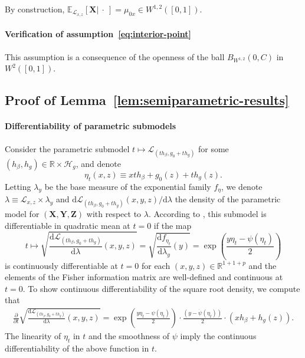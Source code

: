 \documentclass[aos]{imsart}
\theoremstyle{plain}
\theoremstyle{remark}
\newcommand{\E}{\mathbb E}								%
\newcommand{\R}{\mathbb{R}}								%
\newcommand{\prx}{\bm X}								%
\newcommand{\prz}{\bm Z}								%
\newcommand{\pry}{{\bm Y}}								%
\newcommand{\law}{\mathcal L}							%
\renewcommand{\H}{\mathcal H}		 					%
\begin{document}
By construction, $\E_{\law_{x,z}}[\prx |\ \cdot\ ] = \mu_{0x} \in W^{1,2}([0,1])$.

\paragraph*{Verification of assumption~\eqref{eq:interior-point}} This assumption is a consequence of the openness of the ball $B_{W^{1,2}}(0, C)$ in $W^2([0,1])$.

\subsection{Proof of Lemma~\ref{lem:semiparametric-results}} \label{sec:proof-of-lemma-9}

\paragraph*{Differentiability of parametric submodels}

Consider the parametric submodel $t \mapsto \law_{(th_\beta, g_0 + th_g)}$ for some $(h_\beta, h_g) \in \R \times \H_g$, and denote 
\begin{equation*}
\eta_t(x, z) \equiv x th_\beta+g_0(z)+th_g(z). 
\end{equation*}
Letting $\lambda_{y}$ be the base measure of the exponential family $f_\eta$, we denote $\lambda \equiv \law_{x,z} \times \lambda_{y}$ and $\mathrm d \law_{(th_\beta, g_0 + th_g)}(x, y, z)/\mathrm d \lambda$ the density of the parametric model for $(\prx, \pry, \prz)$ with respect to $\lambda$. According to \citet[Lemma 7.6]{VDV1998}, this submodel is differentiable in quadratic mean at $t = 0$ if the map 
\begin{equation*}
t \mapsto \sqrt{\frac{\mathrm d \law_{(th_\beta, g_0 + th_g)}}{\mathrm d\lambda}(x, y, z)} = \sqrt{\frac{\mathrm df_{\eta_t}}{\mathrm d\lambda_y}(y)} = \exp\left(\frac{y\eta_t-\psi(\eta_t)}{2}\right)
\end{equation*}
is continuously differentiable at $t = 0$ for each $(x,  y, z) \in \R^{1 + 1 + p}$ and the elements of the Fisher information matrix are well-defined and continuous at $t = 0$. To show continuous differentiability of the square root density, we compute that
\begin{align*}
	\frac{\partial}{\partial t}\sqrt{\frac{\mathrm d \law_{(th_\beta, g_0 + th_g)}}{\mathrm d\lambda}(x, y, z)} = \exp\left(\frac{y\eta_t-\psi(\eta_t)}{2}\right)\cdot\frac{(y-\dot{\psi}(\eta_t))}{2}\cdot (xh_\beta + h_g(z)).
\end{align*}
The linearity of $\eta_t$ in $t$ and the smoothness of $\psi$ imply the continuous differentiability of the above function in $t$.
\end{document}
